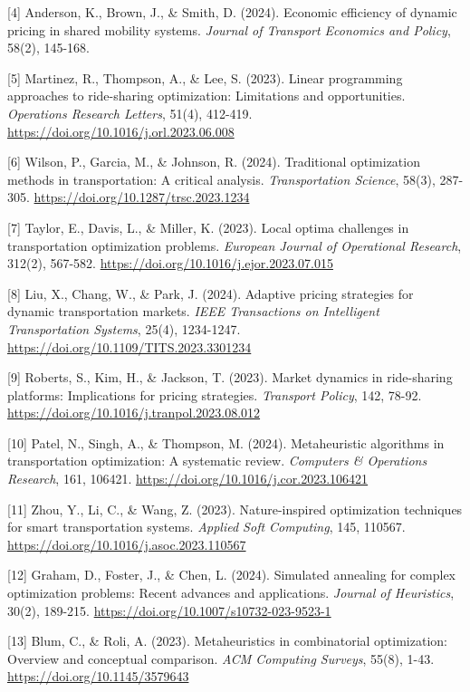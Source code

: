 \documentclass[12pt,a4paper,twocolumn]{article}
\begin{document}
[4] Anderson, K., Brown, J., \& Smith, D. (2024). Economic efficiency of dynamic pricing in shared mobility systems. \textit{Journal of Transport Economics and Policy}, 58(2), 145-168.

[5] Martinez, R., Thompson, A., \& Lee, S. (2023). Linear programming approaches to ride-sharing optimization: Limitations and opportunities. \textit{Operations Research Letters}, 51(4), 412-419. \url{https://doi.org/10.1016/j.orl.2023.06.008}

[6] Wilson, P., Garcia, M., \& Johnson, R. (2024). Traditional optimization methods in transportation: A critical analysis. \textit{Transportation Science}, 58(3), 287-305. \url{https://doi.org/10.1287/trsc.2023.1234}

[7] Taylor, E., Davis, L., \& Miller, K. (2023). Local optima challenges in transportation optimization problems. \textit{European Journal of Operational Research}, 312(2), 567-582. \url{https://doi.org/10.1016/j.ejor.2023.07.015}

[8] Liu, X., Chang, W., \& Park, J. (2024). Adaptive pricing strategies for dynamic transportation markets. \textit{IEEE Transactions on Intelligent Transportation Systems}, 25(4), 1234-1247. \url{https://doi.org/10.1109/TITS.2023.3301234}

[9] Roberts, S., Kim, H., \& Jackson, T. (2023). Market dynamics in ride-sharing platforms: Implications for pricing strategies. \textit{Transport Policy}, 142, 78-92. \url{https://doi.org/10.1016/j.tranpol.2023.08.012}

[10] Patel, N., Singh, A., \& Thompson, M. (2024). Metaheuristic algorithms in transportation optimization: A systematic review. \textit{Computers \& Operations Research}, 161, 106421. \url{https://doi.org/10.1016/j.cor.2023.106421}

[11] Zhou, Y., Li, C., \& Wang, Z. (2023). Nature-inspired optimization techniques for smart transportation systems. \textit{Applied Soft Computing}, 145, 110567. \url{https://doi.org/10.1016/j.asoc.2023.110567}

[12] Graham, D., Foster, J., \& Chen, L. (2024). Simulated annealing for complex optimization problems: Recent advances and applications. \textit{Journal of Heuristics}, 30(2), 189-215. \url{https://doi.org/10.1007/s10732-023-9523-1}

[13] Blum, C., \& Roli, A. (2023). Metaheuristics in combinatorial optimization: Overview and conceptual comparison. \textit{ACM Computing Surveys}, 55(8), 1-43. \url{https://doi.org/10.1145/3579643}
\end{document}

